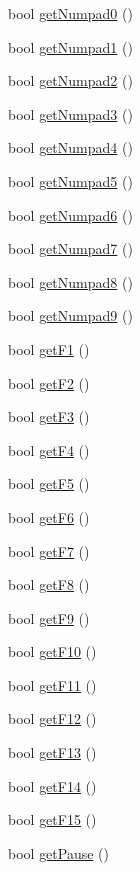 \begin{DoxyCompactItemize}
bool \hyperlink{class_keyboard_a909c70a8e72b75c9515441651b88372d}{get\-Numpad0} ()
\item 
bool \hyperlink{class_keyboard_a1ea935eecc5f69b46898529d6e019d27}{get\-Numpad1} ()
\item 
bool \hyperlink{class_keyboard_a395b15a9fa1916d79bf5fc84f87f0919}{get\-Numpad2} ()
\item 
bool \hyperlink{class_keyboard_a650ce67f4890d668e58f8f2c459f345f}{get\-Numpad3} ()
\item 
bool \hyperlink{class_keyboard_a3d9b7aa434579001274e29919da7351c}{get\-Numpad4} ()
\item 
bool \hyperlink{class_keyboard_a39972d7e2eab16ac5af74a5ba6c0d7a2}{get\-Numpad5} ()
\item 
bool \hyperlink{class_keyboard_a72f11330e522fd2d8d6d096f703b717b}{get\-Numpad6} ()
\item 
bool \hyperlink{class_keyboard_a24ebd525127b9d17386a1e6267905ef5}{get\-Numpad7} ()
\item 
bool \hyperlink{class_keyboard_a181042ca4d186805ff9f3a6d36b14f1b}{get\-Numpad8} ()
\item 
bool \hyperlink{class_keyboard_a1dcfce958bfb7957b1d6b85706f9728f}{get\-Numpad9} ()
\item 
bool \hyperlink{class_keyboard_a89d9b338c53114a8a736b33e9767f72e}{get\-F1} ()
\item 
bool \hyperlink{class_keyboard_a2fec13e7b4db8d34fd460f178b14e54c}{get\-F2} ()
\item 
bool \hyperlink{class_keyboard_a82cc37753de536fed35da764e6c30d26}{get\-F3} ()
\item 
bool \hyperlink{class_keyboard_ac9c2d3a80291c00101e4d89661be33a8}{get\-F4} ()
\item 
bool \hyperlink{class_keyboard_ac10076d1fe94851272cc90cf6690b8cc}{get\-F5} ()
\item 
bool \hyperlink{class_keyboard_adc476a2af4f6ef9a983da62d8d2fed0a}{get\-F6} ()
\item 
bool \hyperlink{class_keyboard_a8e843446827b1c258aaff1d5c0ad0024}{get\-F7} ()
\item 
bool \hyperlink{class_keyboard_ae875c4c35788a819158e2c1a7628d8f6}{get\-F8} ()
\item 
bool \hyperlink{class_keyboard_a154b39d12c6f8cc1c5bfbbb5282bc7e3}{get\-F9} ()
\item 
bool \hyperlink{class_keyboard_ae8a49362a97f0f85ed9f9d4430d3ce39}{get\-F10} ()
\item 
bool \hyperlink{class_keyboard_a88608100c5a4e694922ce5054888407e}{get\-F11} ()
\item 
bool \hyperlink{class_keyboard_a322c334deaf0b92c93416816a482b6ba}{get\-F12} ()
\item 
bool \hyperlink{class_keyboard_abff30ad0570f44cb49f979b7f88f76ea}{get\-F13} ()
\item 
bool \hyperlink{class_keyboard_af1814f932c5b125d113c99a0879c22a0}{get\-F14} ()
\item 
bool \hyperlink{class_keyboard_a2d62f212870972657e5ae965a11df89d}{get\-F15} ()
\item 
bool \hyperlink{class_keyboard_a1bf2789c0743f4f00cb5778d62242315}{get\-Pause} ()
\end{DoxyCompactItemize}
